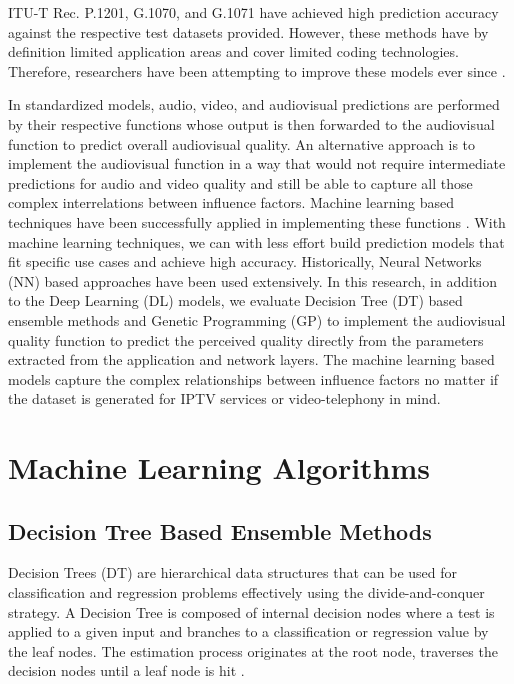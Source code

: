 \documentclass[journal]{IEEEtran}
\begin{document}
ITU-T Rec. P.1201, G.1070, and  G.1071 have achieved high prediction accuracy against the respective test datasets provided. However, these methods have by definition limited application areas and cover limited coding technologies. Therefore, researchers have been attempting to improve these models ever since \cite{garcia2014parametric} \cite{belmudez2015audiovisual}.

In standardized models,  audio, video, and audiovisual predictions are performed by their respective functions whose output is then forwarded to the audiovisual function to predict overall audiovisual quality. An alternative approach is to implement the audiovisual function in a way that would not require intermediate predictions for audio and video quality and still be able to capture all those complex interrelations between influence factors. Machine learning based techniques have been successfully applied in implementing these functions \cite{maki2013reduced} \cite{gastaldo2013supporting}. With machine learning techniques, we can with less effort build prediction models that fit specific use cases and achieve high accuracy. Historically, Neural Networks (NN) based approaches have been used extensively. 
In this research, in addition to the Deep Learning (DL) models, we evaluate Decision Tree (DT) based ensemble methods and Genetic Programming (GP) to implement the audiovisual quality function to predict the perceived quality directly from the parameters extracted from the application and network layers. The machine learning based models capture the complex relationships between influence factors no matter if the dataset is generated for IPTV services or video-telephony in mind.

\section{Machine Learning Algorithms}
\label{sec:ml}

\subsection{Decision Tree Based Ensemble Methods}
Decision Trees (DT) are hierarchical data structures that can be used for classification and regression problems effectively using the divide-and-conquer strategy. A Decision Tree is composed of internal decision nodes where a test is applied to a given input and branches to a classification or regression value by the leaf nodes. The estimation process originates at the root node, traverses the decision nodes until a leaf node is hit \cite{alpaydin2014introduction} \cite{mushtaq2012empirical}.
\end{document}
